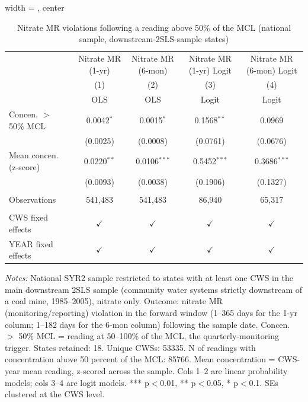
\begin{table}[htbp]
\caption{Nitrate MR violations following a reading above 50\% of the MCL (national sample, downstream-2SLS-sample states)}\label{tab:mr_concentration_lag_national_downstream_states}
\centering
\begin{adjustbox}{width = \textwidth, center}
   \begin{tabular}{lcccc}
      \toprule    
                          & Nitrate MR (1-yr) & Nitrate MR (6-mon)  & Nitrate MR (1-yr) Logit & Nitrate MR (6-mon) Logit \\   
                          & (1)               & (2)                 & (3)                     & (4)\\  
                          &  OLS              & OLS                 & Logit                   & Logit\\  
      \midrule 
      Concen. $>$ 50\% MCL           & 0.0042$^{*}$      & 0.0015$^{*}$        & 0.1568$^{**}$           & 0.0969\\   
                          & (0.0025)          & (0.0008)            & (0.0761)                & (0.0676)\\   
      Mean concen. (z-score)       & 0.0220$^{**}$     & 0.0106$^{***}$      & 0.5452$^{***}$          & 0.3686$^{***}$\\   
                          & (0.0093)          & (0.0038)            & (0.1906)                & (0.1327)\\   
       \\
      Observations        & 541,483           & 541,483             & 86,940                  & 65,317\\  
       \\
      CWS fixed effects & $\checkmark$      & $\checkmark$        & $\checkmark$            & $\checkmark$\\   
      YEAR fixed effects  & $\checkmark$      & $\checkmark$        & $\checkmark$            & $\checkmark$\\   
      \bottomrule
   \end{tabular}
\end{adjustbox}
{\tiny\linespread{1}\selectfont \par \raggedright \textit{Notes:} National SYR2 sample restricted to states with at least one CWS in the main downstream 2SLS sample (community water systems strictly downstream of a coal mine, 1985--2005), nitrate only. Outcome: nitrate MR (monitoring/reporting) violation in the forward window (1--365 days for the 1-yr column; 1--182 days for the 6-mon column) following the sample date. Concen. $>$ 50\% MCL = reading at 50--100\% of the MCL, the quarterly-monitoring trigger. States retained: 18. Unique CWSs: 53335. N of readings with concentration above 50 percent of the MCL: 85766. Mean concentration = CWS-year mean reading, z-scored across the sample. Cols 1--2 are linear probability models; cols 3--4 are logit models. *** p$<$0.01, ** p$<$0.05, * p$<$0.1. SEs clustered at the CWS level.}
\end{table}
